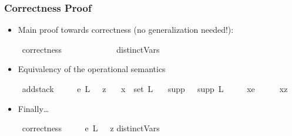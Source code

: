 \documentclass{beamer}
\begin{document}
\begin{frame}
\frametitle{Correctness Proof}

\begin{itemize}
\item Main proof towards correctness (no generalization needed!):
\begin{isabelle}
\isamarkupfalse%
\ correctness{\isacharcolon}\isanewline
\ \ \ {\isachardoublequoteopen}{\isasymGamma}\ {\isacharcolon}\ {\isasymGamma}{\isacharprime}\ {\isasymDown}\ {\isasymDelta}\ {\isacharcolon}\ {\isasymDelta}{\isacharprime}{\isachardoublequoteclose}\isanewline
\ \ \ {\isachardoublequoteopen}distinctVars\ {\isacharparenleft}{\isasymGamma}{\isacharprime}\ {\isacharat}\ {\isasymGamma}{\isacharparenright}{\isachardoublequoteclose}\isanewline
\ \ \ {\isachardoublequoteopen}{\isasymlbrace}{\isasymGamma}{\isacharprime}{\isacharat}{\isasymGamma}{\isasymrbrace}\ {\isasymle}\ {\isasymlbrace}{\isasymDelta}{\isacharprime}{\isacharat}{\isasymDelta}{\isasymrbrace}{\isachardoublequoteclose}
\end{isabelle}
\item Equivalency of the operational semantics
\begin{isabelle}
\isamarkupfalse%
\ add{\isacharunderscore}stack{\isacharcolon}\isanewline
\ \ \ {\isachardoublequoteopen}{\isasymGamma}\ {\isacharcolon}\ e\ {\isasymDown}\isactrlbsub L\isactrlesub \ {\isasymDelta}\ {\isacharcolon}\ z{\isachardoublequoteclose}\isanewline
\ \ \ {\isachardoublequoteopen}x\ {\isasymin}\ set\ L{\isachardoublequoteclose}\isanewline
\ \ \ {\isachardoublequoteopen}supp\ {\isasymGamma}{\isacharprime}\ {\isasymsubseteq}\ supp\ L{\isachardoublequoteclose}\isanewline
\ \ \ {\isachardoublequoteopen}{\isasymGamma}\ {\isacharcolon}\ {\isacharparenleft}x{\isacharcomma}e{\isacharparenright}\ {\isacharhash}\ {\isasymGamma}{\isacharprime}\ {\isasymDown}\ {\isasymDelta}\ {\isacharcolon}\ {\isacharparenleft}x{\isacharcomma}z{\isacharparenright}\ {\isacharhash}\ {\isasymGamma}{\isacharprime}{\isachardoublequoteclose}
\end{isabelle}
\item Finally\dots
\begin{isabelle}
\isamarkupfalse%
\ correctness{\isacharcolon}\isanewline
\ \ \ {\isachardoublequoteopen}{\isasymGamma}\ {\isacharcolon}\ e\ {\isasymDown}\isactrlbsub L\isactrlesub \ {\isasymDelta}\ {\isacharcolon}\ z{\isachardoublequoteclose}  {\isachardoublequoteopen}distinctVars\ {\isasymGamma}{\isachardoublequoteclose}\isanewline

\end{isabelle}
\end{itemize}
\end{frame}
\end{document}
